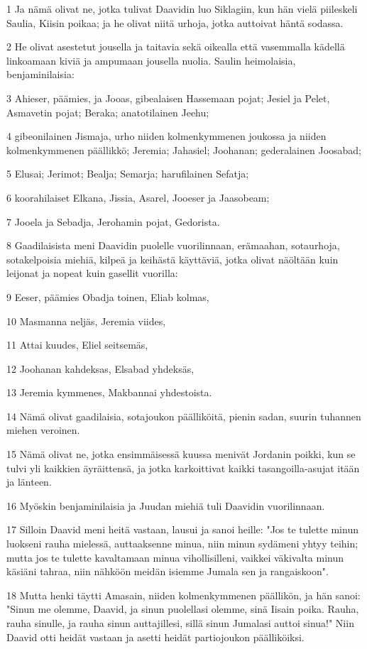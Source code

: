 \par 1 Ja nämä olivat ne, jotka tulivat Daavidin luo Siklagiin, kun hän vielä piileskeli Saulia, Kiisin poikaa; ja he olivat niitä urhoja, jotka auttoivat häntä sodassa.
\par 2 He olivat asestetut jousella ja taitavia sekä oikealla että vasemmalla kädellä linkoamaan kiviä ja ampumaan jousella nuolia. Saulin heimolaisia, benjaminilaisia:
\par 3 Ahieser, päämies, ja Jooas, gibealaisen Hassemaan pojat; Jesiel ja Pelet, Asmavetin pojat; Beraka; anatotilainen Jeehu;
\par 4 gibeonilainen Jismaja, urho niiden kolmenkymmenen joukossa ja niiden kolmenkymmenen päällikkö; Jeremia; Jahasiel; Joohanan; gederalainen Joosabad;
\par 5 Elusai; Jerimot; Bealja; Semarja; harufilainen Sefatja;
\par 6 koorahilaiset Elkana, Jissia, Asarel, Jooeser ja Jaasobeam;
\par 7 Jooela ja Sebadja, Jerohamin pojat, Gedorista.
\par 8 Gaadilaisista meni Daavidin puolelle vuorilinnaan, erämaahan, sotaurhoja, sotakelpoisia miehiä, kilpeä ja keihästä käyttäviä, jotka olivat näöltään kuin leijonat ja nopeat kuin gasellit vuorilla:
\par 9 Eeser, päämies Obadja toinen, Eliab kolmas,
\par 10 Masmanna neljäs, Jeremia viides,
\par 11 Attai kuudes, Eliel seitsemäs,
\par 12 Joohanan kahdeksas, Elsabad yhdeksäs,
\par 13 Jeremia kymmenes, Makbannai yhdestoista.
\par 14 Nämä olivat gaadilaisia, sotajoukon päälliköitä, pienin sadan, suurin tuhannen miehen veroinen.
\par 15 Nämä olivat ne, jotka ensimmäisessä kuussa menivät Jordanin poikki, kun se tulvi yli kaikkien äyräittensä, ja jotka karkoittivat kaikki tasangoilla-asujat itään ja länteen.
\par 16 Myöskin benjaminilaisia ja Juudan miehiä tuli Daavidin vuorilinnaan.
\par 17 Silloin Daavid meni heitä vastaan, lausui ja sanoi heille: "Jos te tulette minun luokseni rauha mielessä, auttaaksenne minua, niin minun sydämeni yhtyy teihin; mutta jos te tulette kavaltamaan minua vihollisilleni, vaikkei väkivalta minun käsiäni tahraa, niin nähköön meidän isiemme Jumala sen ja rangaiskoon".
\par 18 Mutta henki täytti Amasain, niiden kolmenkymmenen päällikön, ja hän sanoi: "Sinun me olemme, Daavid, ja sinun puolellasi olemme, sinä Iisain poika. Rauha, rauha sinulle, ja rauha sinun auttajillesi, sillä sinun Jumalasi auttoi sinua!" Niin Daavid otti heidät vastaan ja asetti heidät partiojoukon päälliköiksi.
